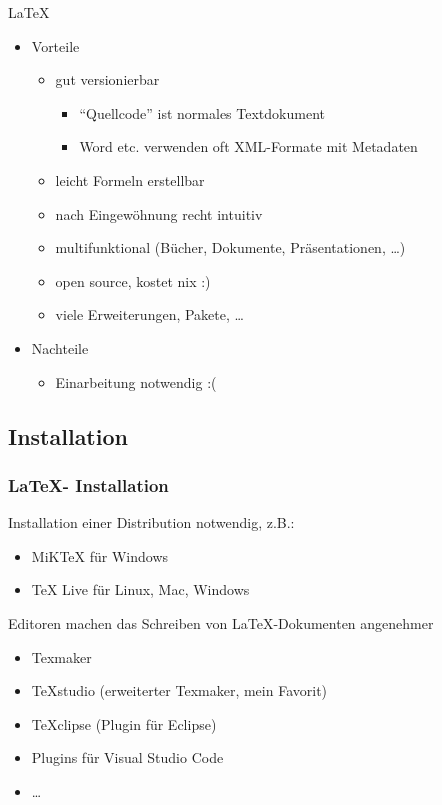 \documentclass[18pt]{beamer}
\begin{document}
	\begin{frame}{\LaTeX}
	\begin{itemize}
		\item Vorteile
		\begin{itemize}
			\item gut versionierbar
			\begin{itemize}
				\item \enquote{Quellcode} ist normales Textdokument
				\item Word etc. verwenden oft XML-Formate mit Metadaten
			\end{itemize}
			\item leicht Formeln erstellbar
			\item nach Eingewöhnung recht intuitiv
			\item multifunktional (Bücher, Dokumente, Präsentationen, \dots)
			\item open source, kostet nix :)
			\item viele Erweiterungen, Pakete, \dots
		\end{itemize}
		\item Nachteile
		\begin{itemize}
			\item Einarbeitung notwendig :(
		\end{itemize} 
	\end{itemize}
				
\end{frame}
	
	\subsection{Installation}
	\begin{frame}
		\frametitle{\LaTeX - Installation}
		Installation einer Distribution notwendig, z.B.:
		\begin{itemize}
			\item  MiKTeX für Windows
			\item TeX Live für Linux, Mac, Windows
		\end{itemize}
		\pause
		Editoren machen das Schreiben von \LaTeX -Dokumenten angenehmer
		\begin{itemize}
			\item Texmaker
			\item TeXstudio (erweiterter Texmaker, mein Favorit)
			\item TeXclipse (Plugin für Eclipse)
			\item Plugins für Visual Studio Code
			\item \dots
		\end{itemize}
	\end{frame}
	
\end{document}
